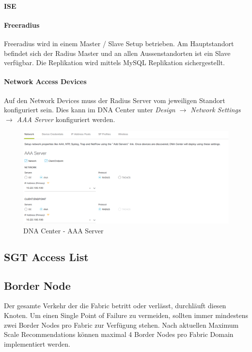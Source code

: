 \paragraph{ISE}


\paragraph{Freeradius}

Freeradius wird in einem Master / Slave Setup betrieben. Am Hauptstandort befindet sich der Radius Master und an allen Aussenstandorten ist ein Slave verfügbar. Die Replikation wird mittels MySQL Replikation sichergestellt.

\paragraph{Network Access Devices}

Auf den Network Devices muss der Radius Server vom jeweiligen Standort konfiguriert sein. Dies kann im DNA Center unter \textit{Design $\rightarrow$ Network Settings $\rightarrow$ AAA Server} konfiguriert werden.

\begin{figure}[H]
	\centering
	\includegraphics[width=0.8\linewidth]{img/Absicherung/DNA_Center_AAA-Server.png}
	\caption{DNA Center - AAA Server }
	\label{fig:DNA Center - AAA Server}
\end{figure}


\subsection{SGT Access List}

\subsection{Border Node}

Der gesamte Verkehr der die Fabric betritt oder verlässt, durchläuft diesen Knoten. Um einen Single Point of Failure zu vermeiden, sollten immer mindestens zwei Border Nodes pro Fabric zur Verfügung stehen. Nach aktuellen Maximum Scale Recommendations können maximal 4 Border Nodes pro Fabric Domain implementiert werden.

